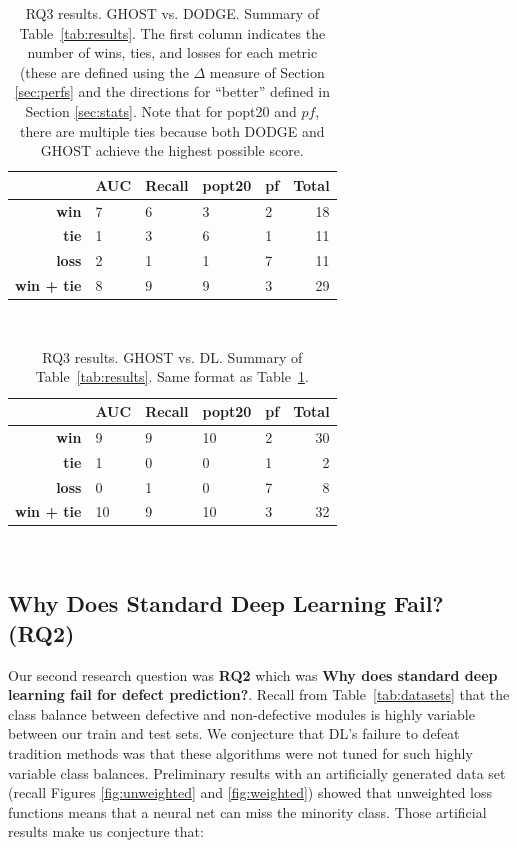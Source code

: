 \documentclass[10pt,compsoc,twocolumn]{IEEEtran}
\begin{document}

\begin{table}[!t]
    \centering
    \caption{RQ3 results. GHOST vs. DODGE. 
    Summary of Table~\ref{tab:results}.
    The first column indicates the number of wins, ties,  and losses  for each metric (these are defined using the $\Delta$ measure of Section \ref{sec:perfs} and the directions for ``better'' defined in Section \ref{sec:stats}.  Note that for popt20 and $pf$, there are multiple ties because both DODGE and GHOST achieve the highest possible score.}
  
  \scriptsize
   \begin{tabular}{rllll|r} 
   \toprule
    & AUC & Recall & popt20 & pf & Total \\
    \midrule
     \textbf{win} & 7 & 6 & 3 & 2 & 18 \\
    \textbf{tie} & 1 & 3 & 6 & 1 & 11 \\
     \textbf{loss} & 2 & 1 & 1 & 7 & 11 \\ \midrule 
     \textbf{win + tie} & 8 & 9 & 9 & 3 & 29 \\
     \bottomrule
    \end{tabular}
    \ 
    \label{tab:ghost_dodge}
\end{table}
\begin{table}[!t]
    \centering
    \caption{RQ3 results. GHOST vs. DL. Summary of Table~\ref{tab:results}. Same format as Table~\ref{tab:ghost_dodge}.}
    \scriptsize
   \begin{tabular}{rllll|r} 
   \toprule
    & AUC & Recall & popt20 & pf & Total \\
    \midrule
     \textbf{win} & 9 & 9 & 10 & 2 & 30 \\
     \textbf{tie} & 1 & 0 & 0 & 1 & 2 \\
     \textbf{loss} & 0 & 1 & 0 & 7 & 8 \\ \midrule 
     \textbf{win + tie} & 10 & 9 & 10 & 3 & 32 \\
     \bottomrule 
    \end{tabular}
    \ 
    \label{tab:ghost_dl}
\end{table}

 
 \subsection{Why Does Standard Deep Learning Fail? ({\bf RQ2})}
 \label{sec:rq2}
Our second research question was  {\bf RQ2} which was 
 {\bf Why does standard deep learning fail for defect prediction?}.
 Recall from Table~\ref{tab:datasets} that the class balance    between defective and non-defective modules is highly variable between our train and test sets.
 We conjecture that DL's failure to defeat tradition methods was that these algorithms were not
 tuned for such highly variable class balances.  Preliminary results with an artificially generated data set (recall Figures \ref{fig:unweighted} and \ref{fig:weighted}) showed that  unweighted loss functions
 means that a neural net can miss the  minority class.
 Those artificial results
 make us conjecture that:
\end{document}
